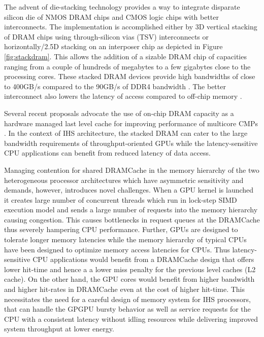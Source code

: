 \par The advent of die-stacking technology \cite{3d-stacking} provides a way to integrate disparate silicon die of NMOS DRAM chips and CMOS logic chips with better interconnects. The implementation is accomplished either by 3D vertical stacking of DRAM chips using through-silicon vias (TSV) interconnects or horizontally/2.5D stacking on an interposer chip as depicted in Figure \ref{fig:stackdram}. This allows the addition of a sizable DRAM chip of capacities ranging from a couple of hundreds of megabytes to a few gigabytes close to the processing cores. These stacked DRAM devices provide high bandwidths of close to 400GB/s compared to the 90GB/s of DDR4 bandwidth \cite{xeonphi}. The better interconnect also lowers the latency of access compared to off-chip memory \cite{alloy}. 
\par Several recent proposals advocate the use of on-chip DRAM capacity as a hardware managed last level cache for improving performance of multicore CMPs \cite{alloy,bimodal,loh-hill,atcache}. In the context of IHS architecture, the stacked DRAM can cater to the large bandwidth requirements of throughput-oriented GPUs while the latency-sensitive CPU applications can benefit from reduced latency of data access. 
\par Managing contention for shared DRAMCache in the memory hierarchy of the two heterogeneous processor architectures which have asymmetric sensitivity and demands, however, introduces novel challenges. When a GPU kernel is launched it creates large number of concurrent threads which run in lock-step SIMD execution model and sends a large number of requests into the memory hierarchy causing congestion. This causes bottlenecks in request queues at the DRAMCache thus severely hampering CPU performance. Further, GPUs are designed to tolerate longer memory latencies while the memory hierarchy of typical CPUs have been designed to optimize memory access latencies for CPUs. 
Thus latency-sensitive CPU applications would benefit from a DRAMCache design that offers lower hit-time and hence a a lower miss penalty for the previous level caches (L2 cache). On the other hand, the GPU cores would benefit from higher bandwidth and higher hit-rates in DRAMCache even at the cost of higher hit-time. This necessitates the need for a careful design of memory system for IHS processors, that can handle the GPGPU bursty behavior as well as service requests for the CPU with a consistent latency without idling resources while delivering improved system throughput at lower energy.

